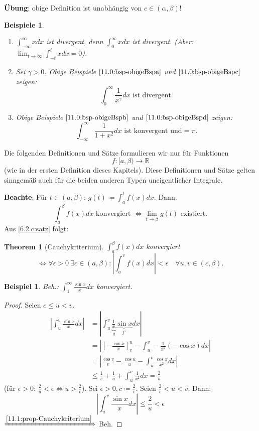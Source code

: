 \documentclass[12pt]{extreport} %
\newcommand{\R}{\mathbb{R}}
\theoremstyle{named}
\newtheorem{unnamedtheorem}{Theorem} \counterwithin{unnamedtheorem}{chapter}
\theoremstyle{dotless}
\newtheorem*{beispiel*}{Beispiel}
\newtheorem*{beispiele}{Beispiele}
\begin{document}
\textbf{Übung}: obige Definition ist unabhängig von $c \in (\alpha, \beta)$!

\begin{beispiele} ~\
	\begin{enumerate}
		\item $\int_{-\infty}^{\infty} x dx$ ist divergent, denn $\int_{0}^{\infty} x dx$ ist divergent. (Aber: $\lim_{t \rightarrow \infty} \int_{-t}^{t} x dx = 0$).
		\item Sei $\gamma > 0$. Obige Beispiele $\ref{11.0:bsp-obigeBspa}$ und $\ref{11.0:bsp-obigeBspc}$ zeigen:
			$$ \int_{0}^{\infty} \frac{1}{x^{\gamma}} dx \text{ ist divergent.} $$
		\item Obige Beispiele $\ref{11.0:bsp-obigeBspb}$ und $\ref{11.0:bsp-obigeBspd}$ zeigen:
			$$ \int_{-\infty}^{\infty} \frac{1}{1 + x^{2}} dx \text{ ist konvergent und} = \pi. $$
	\end{enumerate}
\end{beispiele}

Die folgenden Definitionen und Sätze formulieren wir nur für Funktionen 
	$$ f \colon [a, \beta) \rightarrow \R $$
(wie in der ersten Definition dieses Kapitels). Diese Definitionen und Sätze gelten sinngemä{\ss} auch für die beiden anderen Typen uneigentlicher Integrale.

\textbf{Beachte}: Für $t \in (a, \beta)$: $g(t) \coloneqq \int_{a}^{t} f(x) dx$. Dann:
	$$ \int_{a}^{\beta} f(x) dx \text{ konvergiert } \iff \lim_{t \rightarrow \beta} g(t) \text{ existiert.} $$
Aus \ref{6.2.c:satz} folgt:

\begin{unnamedtheorem}[Cauchykriterium] \label{11.1:prop-Cauchykriterium}
	$\int_{a}^{\beta} f(x) dx$ konvergiert
	$$ \iff \forall \epsilon > 0 ~\exists c \in (a, \beta):  | \int_{u}^{v} f(x) dx | < \epsilon \quad \forall u, v \in (c, \beta).  $$
\end{unnamedtheorem}


\begin{beispiel*}
	Beh.: $\int_{1}^{\infty} \frac{\sin x}{x} dx$ konvergiert.	
\end{beispiel*}

\begin{proof}
	Seien $c \leq u < v$.
	\begin{align*}
		|\int_{u}^{v} \frac{\sin x}{x} dx | & = | \int_{u}^{v} \underbrace{\frac{1}{x}}_{g} \underbrace{\sin x}_{f'} dx | \\
			& = | \left[ -\frac{\cos x}{x} \right]_{v}^{u} - \int_{u}^{v} - \frac{1}{x^{2}} (-\cos x) dx | \\
			& = | \frac{\cos v}{v} - \frac{\cos u}{u} - \int_{u}^{v} \frac{\cos x}{x^{2}} dx | \\
			& \leq \frac{1}{v} + \frac{1}{u} + \int_{u}^{v} \frac{1}{x^{2}} dx = \frac{2}{u}
	\end{align*}
	(für $\epsilon > 0$: $\frac{2}{u} < \epsilon \iff u > \frac{2}{\epsilon}$). Sei $\epsilon > 0, c \coloneqq \frac{2}{\epsilon}$. Seien $\frac{2}{\epsilon} < u < v$. Dann:
	$$ | \int_{u}^{v} \frac{\sin x}{x} dx | \leq \frac{2}{u} < \epsilon $$
	$\xRightarrow[]{\ref{11.1:prop-Cauchykriterium}}$ Beh.
\end{proof}
\end{document}
